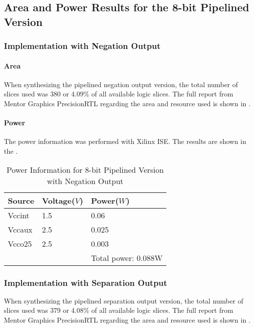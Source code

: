 \subsection{Area and Power Results for the 8-bit Pipelined Version}
\subsubsection{Implementation with Negation Output}
\paragraph{Area}
When synthesizing the pipelined negation output version, the total number of slices used was 380 or 4.09\% 
of all available logic slices. The full report from Mentor Graphics PrecisionRTL regarding the area
and resource used is shown in .

\paragraph{Power}
The power information was performed with Xilinx ISE. The results are shown in the .

\begin{table}[!ht]
	\renewcommand{\arraystretch}{1.3}
	\caption{Power Information for 8-bit Pipelined Version with Negation Output}
	\centering
	\begin{tabular}{ p{4cm} p{4cm} p{4cm} }
		\hline
		\bfseries Source & \bfseries Voltage(\(V\)) & \bfseries Power(\(W\)) \\
		\hline
		Vccint           & 1.5                      & 0.06                   \\
		Vccaux           & 2.5                      & 0.025                  \\
		Vcco25           & 2.5                      & 0.003                  \\
		\hline
		                 &                          & Total power: 0.088W    \\
	\end{tabular}
	\label{tb:p__neg_power}
\end{table}

\subsubsection{Implementation with Separation Output}

When synthesizing the pipelined separation output version, the total number of slices used was 379 or 4.08\% 
of all available logic slices. The full report from Mentor Graphics PrecisionRTL regarding the area
and resource used is shown in .


